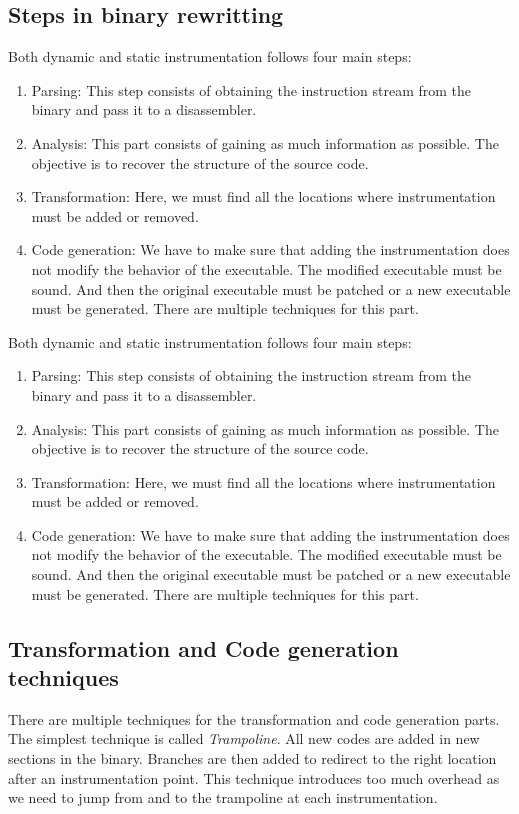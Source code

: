 \documentclass[a4paper,11pt,oneside]{report}
\begin{document}
\subsection{Steps in binary rewritting}
Both dynamic and static instrumentation follows four main steps:
\begin{enumerate}
    \item Parsing:
        This step consists of obtaining the instruction stream from the binary
        and pass it to a disassembler.
    \item Analysis:
        This part consists of gaining as much information as possible. The
        objective is to recover the structure of the source code.
    \item Transformation:
        Here, we must find all the locations where instrumentation must be
        added or removed. 
    \item Code generation:
        We have to make sure that adding the instrumentation does not modify the
        behavior of the executable. The modified executable must be sound. And
        then the original executable must be patched or a new executable must be
        generated.
        There are multiple techniques for this part. 
\end{enumerate}
Both dynamic and static instrumentation follows four main steps:
\begin{enumerate}
    \item Parsing:
        This step consists of obtaining the instruction stream from the binary
        and pass it to a disassembler.
    \item Analysis:
        This part consists of gaining as much information as possible. The
        objective is to recover the structure of the source code.
    \item Transformation:
        Here, we must find all the locations where instrumentation must be
        added or removed. 
    \item Code generation:
        We have to make sure that adding the instrumentation does not modify the
        behavior of the executable. The modified executable must be sound. And
        then the original executable must be patched or a new executable must be
        generated.
        There are multiple techniques for this part. 
\end{enumerate}



\subsection{Transformation and Code generation techniques}
There are multiple techniques for the transformation and code generation
parts. The simplest technique is called \textit{Trampoline}. All new codes are
added in new sections in the binary. Branches are then added to redirect to the
right location after an instrumentation point. This technique introduces too much overhead as we
need to jump from and to the trampoline at each instrumentation. 
\end{document}
